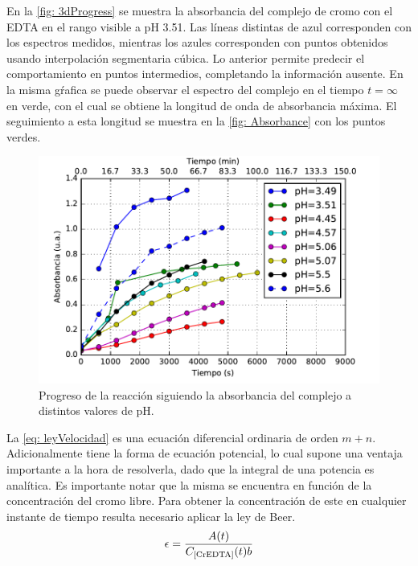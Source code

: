 \documentclass[fleqn,10pt]{SelfArx} %
\begin{document}
	En la \autoref{fig: 3dProgress} se muestra la absorbancia del complejo de cromo con el EDTA en el rango visible a pH 3.51. Las l\'ineas distintas de azul corresponden con los espectros medidos, mientras los azules corresponden con puntos obtenidos usando interpolaci\'on segmentaria c\'ubica. Lo anterior permite predecir el comportamiento en puntos intermedios, completando la informaci\'on ausente. En la misma g\'rafica se puede observar el espectro del complejo en el tiempo $t = \infty$ en verde, con el cual se obtiene la longitud de onda de absorbancia m\'axima. El seguimiento a esta longitud se muestra en la \autoref{fig: Absorbance} con los puntos verdes.
	\begin{figure}[h]
	    \centering
	    \includegraphics[width=\linewidth]{images/Absorbance.pdf}
	    \caption{Progreso de la reacci\'on siguiendo la absorbancia del complejo  a distintos valores de pH.}
	    \label{fig: Absorbance}
	\end{figure}
	
	La \autoref{eq: leyVelocidad} es una ecuaci\'on diferencial ordinaria de orden $m+n$. Adicionalmente tiene la forma de ecuaci\'on potencial, lo cual supone una ventaja importante a la hora de resolverla, dado que la integral de una potencia es anal\'itica. Es importante notar que la misma se encuentra en funci\'on de la concentraci\'on del cromo libre. Para obtener la concentraci\'on de este en cualquier instante de tiempo resulta necesario aplicar la ley de Beer.
	\begin{equation}
	    \epsilon=\dfrac{A(t)}{C_{\ce{[CrEDTA]}}(t) b}
	\end{equation}
	
\end{document}
